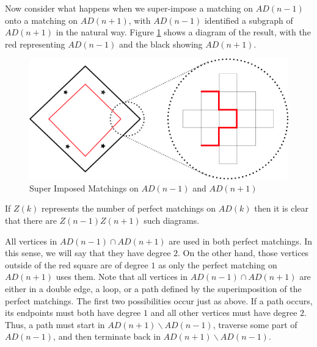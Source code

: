 \documentclass{article}
\begin{document}
\hspace{1cm} Now consider what happens when we super-impose a matching on $AD(n-1)$ onto a matching on $AD(n+1)$, with $AD(n-1)$ identified a subgraph of $AD(n+1)$ in the natural way. Figure \ref{fig:super_diag} shows a diagram of the result, with the red representing $AD(n-1)$ and the black showing $AD(n+1)$.  
\begin{figure}[h]
	\begin{center}
 	\includegraphics[width=.7\textwidth]{super_diagram.png}
  	\caption{Super Imposed Matchings on $AD(n-1)$ and $AD(n+1)$}
	 \label{fig:super_diag}
 	 \end{center}
\end{figure} 
If $Z(k)$ represents the number of perfect matchings on $AD(k)$ then it is clear that there are $Z(n-1) Z(n+1)$ such diagrams. 

All vertices in $AD(n-1) \cap AD(n+1)$ are used in both perfect matchings. In this sense, we will say that they have degree $2$. On the other hand, those vertices outside of the red square are of degree $1$ as only the perfect matching on $AD(n+1)$ uses them. Note that all vertices in $AD(n-1) \cap AD(n+1)$ are either in a double edge, a loop, or a path defined by the superimposition of the perfect matchings. The first two possibilities occur just as above. If a path occurs, its endpoints must both have degree $1$ and all other vertices must have degree $2$. Thus, a path must start in $AD(n+1) \smallsetminus AD(n-1)$, traverse some part of $AD(n-1)$, and then terminate back in $AD(n+1) \smallsetminus AD(n-1)$. 
\end{document}
